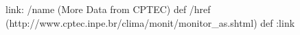 
\begin{ingrid}
link:
/name (More Data from CPTEC) def
/href (http://www.cptec.inpe.br/clima/monit/monitor_as.shtml) def
:link
\end{ingrid}
